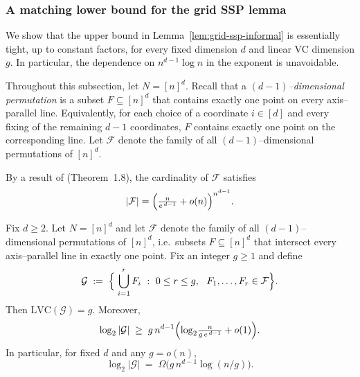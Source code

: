 \documentclass[arxiv]{colt2026}
\newcommand{\F}{\mathcal{F}}
\newcommand{\G}{\mathcal{G}}
\newcommand{\LVC}{\mathrm{LVC}}
\begin{document}
\subsubsection{A matching lower bound for the grid SSP lemma}
\label{sec:lower-bound-ssp}

We show that the upper bound in Lemma~\ref{lem:grid-ssp-informal} is essentially
tight, up to constant factors, for every fixed dimension $d$ and linear VC
dimension $g$.
In particular, the dependence on $n^{d-1}\log n$ in the exponent is unavoidable.

Throughout this subsection, let $N=[n]^d$.
Recall that a \emph{$(d-1)$--dimensional permutation} is a subset
$F\subseteq [n]^d$ that contains exactly one point on every axis--parallel line.
Equivalently, for each choice of a coordinate $i\in[d]$ and every fixing of the
remaining $d-1$ coordinates, $F$ contains exactly one point on the corresponding
line.
Let $\F$ denote the family of all $(d-1)$--dimensional permutations of $[n]^d$.

By a result of \citet{keevash2018} (Theorem~1.8), the cardinality of $\F$ satisfies
\begin{equation}
\label{eq:keevash}
|\F|
=
\Bigl(\tfrac{n}{e^{\,d-1}}+o(n)\Bigr)^{n^{d-1}}.
\end{equation}



\begin{lemma}
\label{lem:grid-ssp-lower}
Fix $d\ge 2$.
Let $N=[n]^d$ and let $\F$ denote the family of all $(d\!-\!1)$--dimensional
permutations of $[n]^d$, i.e.\ subsets $F\subseteq [n]^d$ that intersect every
axis--parallel line in exactly one point.
Fix an integer $g\ge 1$ and define
\[
\G
\;:=\;
\Bigl\{\; \bigcup_{i=1}^r F_i \ :\ 0\le r\le g,\ \ F_1,\ldots,F_r\in\F \Bigr\}.
\]
Then $\LVC(\G)=g$.
Moreover, 
\begin{equation}
\label{eq:lower-bound-logG}
\log_2|\G|
\;\ge\;
g\,n^{d-1}\Bigl(\log_2\!\tfrac{n}{g\,e^{\,d-1}}+o(1)\Bigr).
\end{equation}
In particular, for fixed $d$ and any $g=o(n)$,
\[
\log_2|\G|
\;=\;
\Omega\!\bigl(g\,n^{d-1}\log(n/g)\bigr).
\]
\end{lemma}
\end{document}
